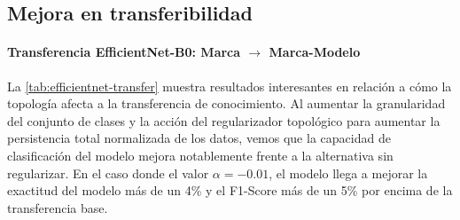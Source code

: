 \subsection{Mejora en transferibilidad}

\paragraph{Transferencia EfficientNet-B0: Marca $\to$ Marca-Modelo}

La \autoref{tab:efficientnet-transfer} muestra resultados interesantes en relación
a cómo la topología afecta a la transferencia de conocimiento. Al aumentar la
granularidad del conjunto de clases y la acción del regularizador topológico
para aumentar la persistencia total normalizada de los datos, vemos que la capacidad
de clasificación del modelo mejora notablemente frente a la alternativa sin regularizar.
En el caso donde el valor $\alpha = -0.01$, el modelo llega a mejorar la exactitud
del modelo más de un 4\% y el F1-Score más de un 5\% por encima de la transferencia
base.

